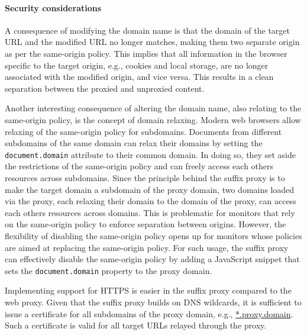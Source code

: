 \documentclass{llncs}
\newcommand{\todo}[1]{\colorbox{red}{\textcolor{white}{\sffamily\bfseries\scriptsize TODO}} \textcolor{red}{#1} \textcolor{red}{$\blacktriangleleft$}}
\begin{document}





\paragraph{Security considerations}

A consequence of modifying the domain name is that the domain of the
target URL and the modified URL no longer matches, making them two 
separate origin as per the same-origin policy. This implies that all information in 
the browser specific to the target origin, e.g., cookies and local storage, 
are no longer associated with the modified origin, and vice versa. This results 
in a clean separation between the proxied and unproxied content.  

Another interesting consequence of altering the domain name, also relating to 
the same-origin policy, is the concept of domain relaxing. Modern web browsers 
allow relaxing of the same-origin policy for subdomains. Documents from different subdomains of the same 
domain can relax their domains by setting the \lstinline{document.domain} attribute
to their common domain. In doing so, they set aside the restrictions of the 
same-origin policy and can freely access each others resources across subdomains. 
Since the principle behind the suffix proxy is to make the target domain a subdomain of the proxy domain, two 
domains loaded via the proxy, each relaxing their domain to the domain of the 
proxy, can access each others resources across domains.
This is problematic for monitors that rely on the same-origin policy to enforce 
separation between origins. However, the flexibility of disabling the same-origin
policy opens up for monitors whose policies are aimed
at replacing the same-origin policy. 
For such usage, the suffix proxy can effectively disable the same-origin 
policy by adding a JavaScript snippet that sets the \lstinline{document.domain} property
to the proxy domain. 


Implementing support for HTTPS is easier in the suffix proxy compared to the web proxy. 
Given that the suffix proxy builds on DNS wildcards, it is sufficient to issue a certificate
for all subdomains of the proxy domain, e.g., \url{*.proxy.domain}. Such a 
certificate is valid for all target URLs relayed through the proxy.
\end{document}
